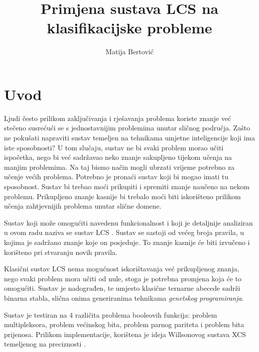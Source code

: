 \documentclass[times, utf8, zavrsni]{fer}
\begin{document}

\title{Primjena sustava LCS na klasifikacijske probleme}

\author{Matija Bertović}

\maketitle



\zahvala{}

\tableofcontents

\chapter{Uvod}
Ljudi često prilikom zaključivanja i rješavanja problema koriste znanje već stečeno susrećući se s jednostavnijim problemima unutar sličnog područja.
Zašto ne pokušati napraviti sustav temeljen na tehnikama umjetne inteligencije koji ima iste sposobnosti?
U tom slučaju, sustav ne bi svaki problem morao učiti ispočetka, nego bi već sadržavao neko znanje sakupljeno tijekom učenja na manjim problemima.
Na taj bismo način mogli ubrzati vrijeme potrebno za učenje većih problema.
Potrebno je pronaći sustav koji bi mogao imati tu sposobnost.
Sustav bi trebao moći prikupiti i spremiti znanje naučeno na nekom problemu.
Prikupljeno znanje kasnije bi trebalo moći biti iskorišteno prilikom učenja zahtjevnijih problema unutar slične domene.

Sustav koji može omogućiti navedenu funkcionalnost i koji je detaljnije analiziran u ovom radu naziva se sustav LCS .
Sustav se sastoji od većeg broja pravila, u kojima je sadržano znanje koje on posjeduje.
To znanje kasnije će biti izvučeno i korišteno pri stvaranju novih pravila.

Klasični sustav LCS nema mogućnost iskorištavanja već prikupljenog znanja, nego svaki problem mora učiti od nule, stoga je potrebna promjena koja će to omogućiti.
Sustav je nadograđen, te umjesto klasične ternarne abecede sadrži binarna stabla, slična onima generiranima tehnikama \emph{genetskog programiranja}.

Sustav je testiran na 4 različita problema booleovih funkcija: problem multipleksora, problem većinskog bita, problem parnog pariteta i problem bita prijenosa.
Prilikom implementacije, korištena je ideja Willsonovog sustava XCS temeljenog na preciznosti \citep{2}.
\end{document}
